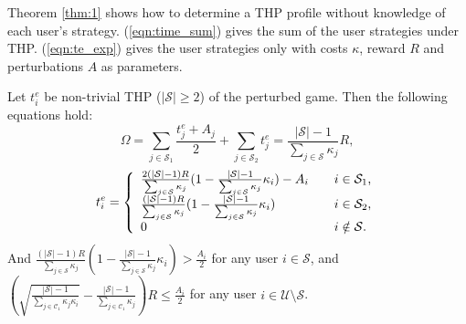 \documentclass{IEEEtran}
\begin{document}
Theorem \ref{thm:1} shows how to determine a THP profile without knowledge of each user's strategy. (\ref{eqn:time_sum}) gives the sum of the user strategies under THP. (\ref{eqn:te_exp}) gives the user strategies only with costs $\kappa$, reward $R$ and perturbations $A$ as parameters.
\begin{theorem}
\label{thm:1}
Let $t_i^{e}$ be non-trivial THP ($|\mathcal{S}|\geq 2$) of the perturbed game. Then the following equations hold:
\begin{equation}
\label{eqn:time_sum}
\Omega=\sum_{j\in \mathcal{S}_1}\frac{t_j^{e}+A_j}{2}+\sum_{j\in \mathcal{S}_2}t_j^{e}=\frac{|\mathcal{S}|-1}{\sum_{j\in\mathcal{S}}\kappa_j}R,
\end{equation}
\begin{equation}
\label{eqn:te_exp}
t_i^{e}=\left\{
\begin{array}{l l}
\frac{2(|\mathcal{S}|-1)R}{\sum_{j\in\mathcal{S}}\kappa_j}(1-\frac{|\mathcal{S}|-1}{\sum_{j\in\mathcal{S}}\kappa_j}\kappa_i)-A_i & \quad \text{$i\in\mathcal{S}_1$,}\\
\frac{(|\mathcal{S}|-1)R}{\sum_{j\in\mathcal{S}}\kappa_j}(1-\frac{|\mathcal{S}|-1}{\sum_{j\in\mathcal{S}}\kappa_j}\kappa_i) & \quad \text{$i\in\mathcal{S}_2$,}\\
0 & \quad \text{$i\notin\mathcal{S}$.}
\end{array}\right.
\end{equation}
And $\frac{(|\mathcal{S}|-1)R}{\sum_{j\in\mathcal{S}}\kappa_j}(1-\frac{|\mathcal{S}|-1}{\sum_{j\in\mathcal{S}}\kappa_j}\kappa_i)>\frac{A_i}{2}$ for any user $i\in\mathcal{S}$, and $(\sqrt{\frac{|\mathcal{S}|-1}{\sum_{j\in\mathcal{C}_1}\kappa_j\kappa_i}}-\frac{|\mathcal{S}|-1}{\sum_{j\in\mathcal{C}_1}\kappa_j})R\leq\frac{A_i}{2}$ for any user $i \in\mathcal{U}\setminus\mathcal{S}$.
\end{theorem}
\end{document}
